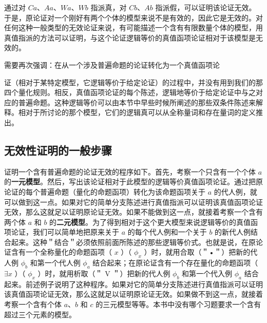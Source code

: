 通过对 $C a 、 A a 、 W a 、 W b$ 指派真，对 $C b 、 A b$ 指派假，可以证明该论证无效。于是，原论证对一个刚好有两个个体的模型来说不是有效的，因此它是无效的。对任何这种一般类型的无效论证来说，有可能描述一个含有有限数量个体的模型，用真值指派的方法可以证明，与这个论证逻辑等价的真值函项论证相对于该模型是无效的。

需要再次强调：在从一个涉及普遍命题的论证转化为一个真值函项论

证（相对于某特定模型，它逻辑等价于给定论证）的过程中，并没有用到我们的那四个量化规则。相反，真值函项论证的每个陈述，逻辑地等价于给定论证中与之对应的普遍命题。这种逻辑等价可以由本节中早些时候所阐述的那些双条件陈述来解释。相对于所讨论的那个模型，它们的逻辑真可以从全称量词和存在量词的定义推出。

\subsection{无效性证明的一般步骤}

证明一个含有普遍命题的论证无效的程序如下。首先，考察一个只含有一个个体 $a$ 的\textbf{一元模型}。然后，写出该论证相对于此模型的逻辑等价真值函项论证。通过把原论证的每个普遍命题（量化的命题函项）转化为该命题函项关于 $a$ 的代人例，就可以做到这一点。如果对它的简单分支陈述进行真值指派可以证明该真值函项论证无效，那么这就足以证明原论证无效。如果不能做到这一点，就接着考察一个含有两个体 $a$ 和 $b$ 的\textbf{二元模型}。为了得到相对于这个更大模型来说逻辑等价的真值函项论证，我们可以简单地把原来关于 $a$ 的每个代人例和一个关于 $b$ 的新代人例结合起来。这种＂结合＂必须依照前面所陈述的那些逻辑等价式。也就是说，在原论证含有一个全称量化的命题函项（ $x$ ）（ $\phi_{x}$ ）时，就用合取（＂•＂）把新的代人例 $\phi_{b}$ 和第一个代人例 $\phi_{a}$ 结合起来；在原论证含有一个存在量化的命题函项（ $\exists x$ ）（ $\phi_{x}$ ）时，就用析取（＂ V ＂）把新的代人例 $\phi_{b}$ 和第一个代入例 $\phi_{a}$ 结合起来。前述例子说明了这种程序。如果对它的简单分支陈述进行真值指派可以证明该真值函项论证无效，那么这就足以证明原论证无效。如果做不到这一点，就接着考察一个含有个体 $a 、 b$ 和 $c$ 的三元模型等等。本书中没有哪个习题要求一个含有超过三个元素的模型。 

